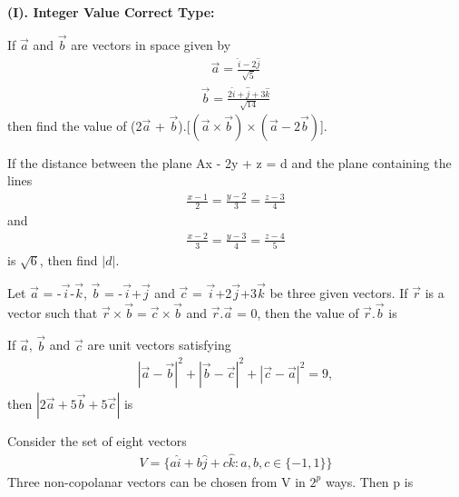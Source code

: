 \textbf{(I). Integer Value Correct Type:}

\item If $\overrightarrow{a}$ and $\overrightarrow{b}$ are vectors in space given by 
\begin{align*}
\overrightarrow{a} = \frac{\hat{i} - 2\hat{j}}{\sqrt{5}}
\end{align*}
\begin{align*}
\overrightarrow{b} = \frac{2\hat{i} + \hat{j} + 3\hat{k}}{\sqrt{14}}
\end{align*}
then find the value of (2$\overrightarrow{a}$ + $\overrightarrow{b}$).[$(\overrightarrow{a} \times \overrightarrow{b}) \times (\overrightarrow{a} - 2\overrightarrow{b})$].

\item If the distance between the plane Ax - 2y + z = d and the plane containing the lines
\begin{align*}
\frac{x-1}{2} = \frac{y-2}{3} = \frac{z-3}{4}
\end{align*}
and
\begin{align*}
\frac{x-2}{3} = \frac{y-3}{4} = \frac{z-4}{5}
\end{align*}
is $\sqrt{6}$, then find $|d|$.

\item Let $\overrightarrow{a}$ = -$\overrightarrow{i}$-$\overrightarrow{k}$, $\overrightarrow{b}$ = -$\overrightarrow{i}$+$\overrightarrow{j}$ and $\overrightarrow{c}$ = $\overrightarrow{i}$+2$\overrightarrow{j}$+3$\overrightarrow{k}$ be three given vectors. If $\overrightarrow{r}$ is a vector such that $\overrightarrow{r} \times \overrightarrow{b} = \overrightarrow{c} \times \overrightarrow{b}$ and $\overrightarrow{r}.\overrightarrow{a}$ = 0, then the value of $\overrightarrow{r}.\overrightarrow{b}$ is

\item If $\overrightarrow{a}$, $\overrightarrow{b}$ and $\overrightarrow{c}$ are unit vectors satisfying
\begin{align*}
|\overrightarrow{a}-\overrightarrow{b}|^{2} + |\overrightarrow{b}-\overrightarrow{c}|^{2} + |\overrightarrow{c}-\overrightarrow{a}|^{2} = 9,
\end{align*}
then $|2\overrightarrow{a} + 5\overrightarrow{b} + 5\overrightarrow{c}|$ is

\item Consider the set of eight vectors
\begin{align*}
V = \{a\hat{i} + b\hat{j} + c\hat{k}:a, b, c \in \{-1, 1\}\}
\end{align*}
Three non-copolanar vectors can be chosen from V in $2^{p}$ ways. Then p is 

